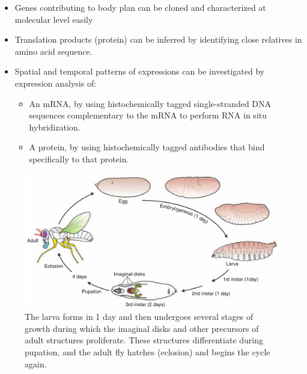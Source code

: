\documentclass[11pt,dvipsnames,ignorenonframetext,aspectratio=169]{beamer}
\providecommand{\tightlist}{%
  \setlength{\itemsep}{0pt}\setlength{\parskip}{0pt}}
\begin{document}
\begin{frame}{}
\protect\hypertarget{section-5}{}

\begin{itemize}
\tightlist
\item
  Genes contributing to body plan can be cloned and characterized at
  molecular level easily
\item
  Translation products (protein) can be inferred by identifying close
  relatives in amino acid sequence.
\item
  Spatial and temporal patterns of expressions can be investigated by
  expression analysis of:

  \begin{itemize}
  \tightlist
  \item
    An mRNA, by using histochemically tagged single-stranded DNA
    sequences complementary to the mRNA to perform RNA in situ
    hybridization.
  \item
    A protein, by using histochemically tagged antibodies that bind
    specifically to that protein.
  \end{itemize}
\end{itemize}

\end{frame}

\begin{frame}{}
\protect\hypertarget{section-6}{}

\begin{figure}
\includegraphics[width=0.55\linewidth]{./../images/drosophila_development} \caption{The larva forms in 1 day and then undergoes several stages of growth during which the imaginal disks and other precursors of adult structures proliferate. These structures differentiate during pupation, and the adult fly hatches (eclosion) and begins the cycle again.}\label{fig:drosophila-development}
\end{figure}

\end{frame}
\end{document}
